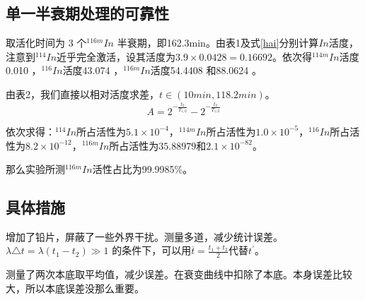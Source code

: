\documentclass[hyperref]{ctexart}
\begin{document}
\begin{multicols}{2}
	\subsection{单一半衰期处理的可靠性}
	取活化时间为 3 个$^{116m}In$ 半衰期，即162.3min。由表1及式\eqref{hai}分别计算$In$活度，注意到$^{114}In$近乎完全激活，设其活度为$3.9\times 0.0428 = 0.16692$。依次得$^{114m}In$活度0.010 ，$^{116}In$活度43.074 ，$^{116m}In$活度54.4408 和88.0624 。

	由表2，我们直接以相对活度求差，$t \in (10min,118.2min)$。
	\begin{equation}
	A =2^{-\frac{t_2}{T_{1/2}}}-2^{-\frac{t_2}{T_{1/2}}}
	\end{equation}
	
	依次求得：$^{114}In$所占活性为$5.1 \times 10^{-4}$，$^{114m}In$所占活性为$1.0 \times 10^{-5}$，$^{116}In$所占活性为$8.2 \times 10^{-12}$，$^{116m}In$所占活性为$35.88979$和$2.1 \times 10^{-82}$。

	那么实验所测$^{116m}In$活性占比为99.9985\%。

	\subsection{具体措施}
	增加了铅片，屏蔽了一些外界干扰。测量多道，减少统计误差。$\lambda \triangle t = \lambda(t_1-t_2) \gg 1$ 的条件下，可以用$\overline{t}=\frac{t_1+t_2}{2}$代替$t^{\prime}$。

	测量了两次本底取平均值，减少误差。在衰变曲线中扣除了本底。本身误差比较大，所以本底误差没那么重要。























\end{multicols}
\end{document}
